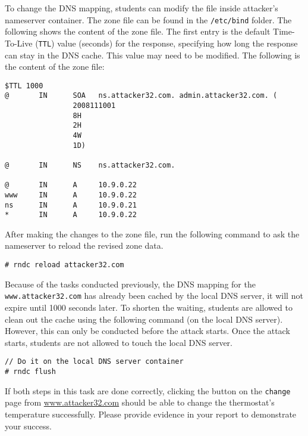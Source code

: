 To change the DNS mapping, students can modify the 
 file inside attacker's nameserver container.
The zone file can be found in 
the \texttt{/etc/bind} folder. 
The following shows the content of the zone file. The first 
entry is the default Time-To-Live (\texttt{TTL}) value (seconds) 
for the response, specifying how long the response can stay in
the DNS cache. This value may need to be modified. 
The following is the content of the zone file:

\begin{lstlisting}
$TTL 1000
@       IN      SOA   ns.attacker32.com. admin.attacker32.com. (
                2008111001
                8H
                2H
                4W
                1D)

@       IN      NS    ns.attacker32.com.

@       IN      A     10.9.0.22
www     IN      A     10.9.0.22
ns      IN      A     10.9.0.21
*       IN      A     10.9.0.22
\end{lstlisting}


After making the changes to the zone file, 
run the following command to ask the nameserver 
to reload the revised zone data. 

\begin{lstlisting}
# rndc reload attacker32.com
\end{lstlisting}



Because of the tasks conducted previously, the DNS mapping for the 
\texttt{www.attacker32.com} has already been cached by the local
DNS server, it will not expire until 1000 seconds later.  To 
shorten the waiting, students are allowed to clean out the cache using the 
following command (on the local DNS server). However, this can only be 
conducted before the attack starts. Once the attack starts, students 
are not allowed to touch the local DNS server. 

\begin{lstlisting}
// Do it on the local DNS server container
# rndc flush
\end{lstlisting}
 
 
If both steps in this task are done correctly, clicking the button 
on the \texttt{change} page from \url{www.attacker32.com} should be able to change
the thermostat's temperature successfully. Please provide evidence in your report to
demonstrate your success.


